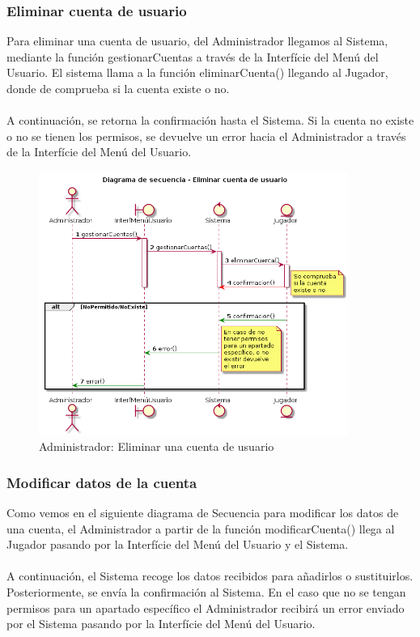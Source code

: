 \subsubsection{Eliminar cuenta de usuario}
  Para eliminar una cuenta de usuario, del Administrador llegamos al Sistema, mediante la función gestionarCuentas a través de la Interfície del Menú del Usuario. El sistema llama a la función eliminarCuenta() llegando al Jugador, donde de comprueba si la cuenta existe o no.\\
  \\A continuación, se retorna la confirmación hasta el Sistema. Si la cuenta no existe o no se tienen los permisos, se devuelve un error hacia el Administrador a través de la Interfície del Menú del Usuario.
  \begin{figure} [ht]
	\centering
	\includegraphics[width=0.9\textwidth]{./imatges/administrador/Eliminar_cuenta_de_usuario.png}
	\caption{Administrador: Eliminar una cuenta de usuario}
\end{figure}
  

\newpage
\subsubsection{Modificar datos de la cuenta}
  Como vemos en el siguiente diagrama de Secuencia para modificar los datos de una cuenta, el Administrador a partir de la función modificarCuenta() llega al Jugador pasando por la Interfície del Menú del Usuario y el Sistema.\\
  \\A continuación, el Sistema recoge los datos recibidos para añadirlos o sustituirlos. Posteriormente, se envía la confirmación al Sistema. En el caso que no se tengan permisos para un apartado específico el Administrador recibirá un error enviado por el Sistema pasando por la Interfície del Menú del Usuario.
  
